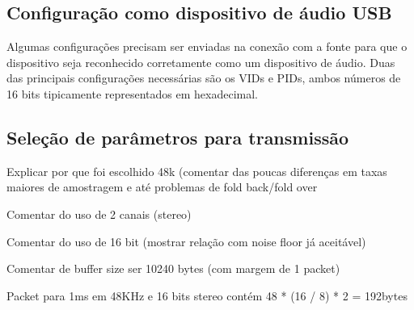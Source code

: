 


\subsection{Configuração como dispositivo de áudio USB}
Algumas configurações precisam ser enviadas na conexão com a fonte para que o dispositivo seja reconhecido corretamente como um dispositivo de áudio. Duas das principais configurações necessárias são os VIDs e PIDs, ambos números de 16 bits tipicamente representados em hexadecimal.

\subsection{Seleção de parâmetros para transmissão}
\color{orange}
Explicar por que foi escolhido 48k (comentar das poucas diferenças em taxas maiores de amostragem e até problemas de fold back/fold over


Comentar do uso de 2 canais (stereo)

Comentar do uso de 16 bit (mostrar relação com noise floor já aceitável)

Comentar de buffer size ser 10240 bytes (com margem de 1 packet)



Packet para 1ms em 48KHz e 16 bits stereo contém 48 * (16 / 8) * 2 = 192bytes
\color{black}


